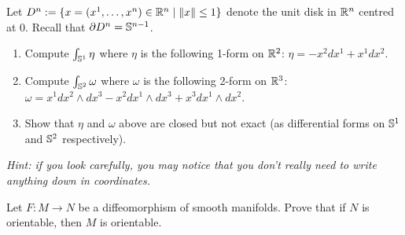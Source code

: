 \begin{exercise}
	Let $D^n := \{x=(x^1, \ldots, x^n)\in\mathbb{R}^n \mid \|x\| \leq 1\}$ denote the unit disk in $\mathbb{R}^n$ centred at $0$. Recall that $\partial D^n = \mathbb{S}^{n-1}$.
	\begin{enumerate}
		\item Compute $\int_{\mathbb{S}^1} \eta$ where $\eta$ is the following 1-form on $\mathbb{R}^2$: $\eta = -x^2 dx^1 + x^1 dx^2$.
		\item Compute $\int_{\mathbb{S}^2} \omega$ where $\omega$ is the following 2-form on $\mathbb{R}^3$: $\omega = x^1 dx^2\wedge dx^3 - x^2 dx^1\wedge dx^3 + x^3 dx^1\wedge dx^2$.
		\item Show that $\eta$ and $\omega$ above are closed but not exact (as differential forms on $\mathbb{S}^1$ and $\mathbb{S}^2$ respectively).
	\end{enumerate}
	\textit{\small Hint: if you look carefully, you may notice that you don't really need to write anything down in coordinates.}
\end{exercise}

\begin{exercise}
	Let $F: M \to N$ be a diffeomorphism of smooth manifolds.
	Prove that if $N$ is orientable, then $M$ is orientable.
\end{exercise}

